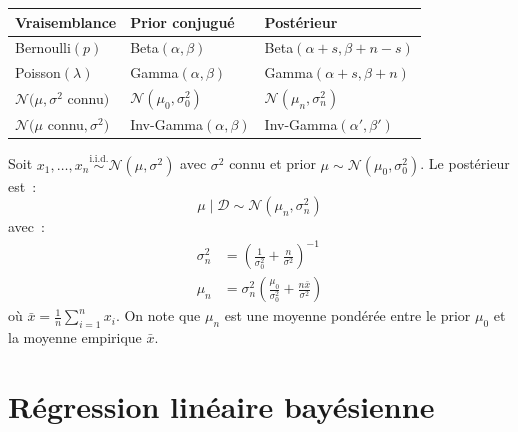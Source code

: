 \begin{formules}[title=\textbf{Exemples de priors conjugu\'es}]
\begin{center}
\renewcommand{\arraystretch}{1.3}
\begin{tabular}{lll}
  \toprule
  \textbf{Vraisemblance} & \textbf{Prior conjugu\'e} & \textbf{Post\'erieur} \\
  \midrule
  Bernoulli$(p)$ & Beta$(\alpha, \beta)$ &
    Beta$(\alpha + s, \beta + n - s)$ \\
  Poisson$(\lambda)$ & Gamma$(\alpha, \beta)$ &
    Gamma$(\alpha + s, \beta + n)$ \\
  $\mathcal{N}(\mu, \sigma^2$ connu$)$ &
    $\mathcal{N}(\mu_0, \sigma_0^2)$ &
    $\mathcal{N}(\mu_n, \sigma_n^2)$ \\
  $\mathcal{N}(\mu$ connu$, \sigma^2)$ &
    Inv-Gamma$(\alpha, \beta)$ &
    Inv-Gamma$(\alpha', \beta')$ \\
  \bottomrule
\end{tabular}
\end{center}
\end{formules}

\begin{exemple}
Soit $x_1, \ldots, x_n \overset{\text{i.i.d.}}{\sim}
\mathcal{N}(\mu, \sigma^2)$ avec $\sigma^2$ connu et prior
$\mu \sim \mathcal{N}(\mu_0, \sigma_0^2)$. Le post\'erieur est~:
\begin{equation}
  \mu \mid \mathcal{D} \sim \mathcal{N}(\mu_n, \sigma_n^2)
\end{equation}
avec~:
\begin{align}
  \sigma_n^2 &= \left(\frac{1}{\sigma_0^2} + \frac{n}{\sigma^2}\right)^{-1}
  \label{eq:post-var} \\
  \mu_n &= \sigma_n^2 \left(\frac{\mu_0}{\sigma_0^2} +
  \frac{n\bar{x}}{\sigma^2}\right)
  \label{eq:post-mean}
\end{align}
o\`u $\bar{x} = \frac{1}{n}\sum_{i=1}^n x_i$. On note que $\mu_n$ est une
moyenne pond\'er\'ee entre le prior $\mu_0$ et la moyenne empirique $\bar{x}$.
\end{exemple}

\section{R\'egression lin\'eaire bay\'esienne}
\label{sec:blr}

